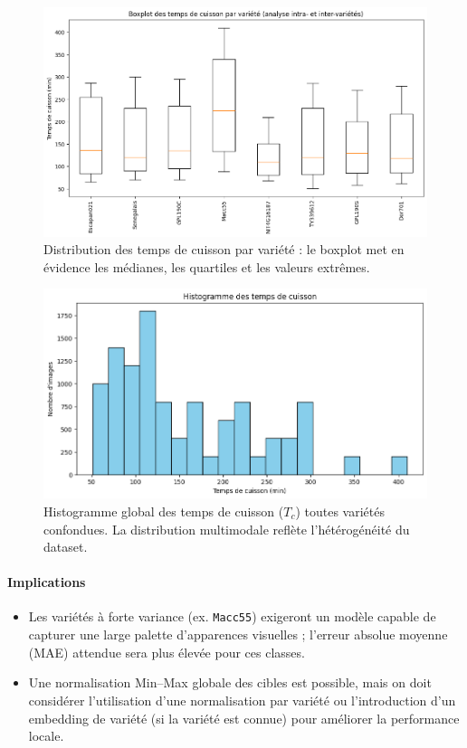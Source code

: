 \begin{figure}[H]
    \centering
    \includegraphics[width=0.8\linewidth]{figures/boxplot_tc.png}
    \caption{Distribution des temps de cuisson par variété : le boxplot met en évidence les médianes, les quartiles et les valeurs extrêmes.}
    \label{fig:boxplot_tc}
\end{figure}

\begin{figure}[H]
    \centering
    \includegraphics[width=0.8\linewidth]{figures/histogramme_tc.png}
    \caption{Histogramme global des temps de cuisson ($T_c$) toutes variétés confondues. La distribution multimodale reflète l’hétérogénéité du dataset.}
    \label{fig:hist_tc}
\end{figure}

\paragraph{Implications}
\begin{itemize}
	\item Les variétés à forte variance (ex. \texttt{Macc55}) exigeront un modèle capable de capturer une large palette d'apparences visuelles ; l'erreur absolue moyenne (MAE) attendue sera plus élevée pour ces classes.
	\item Une normalisation Min--Max globale des cibles est possible, mais on doit considérer l'utilisation d'une normalisation par variété ou l'introduction d'un embedding de variété (si la variété est connue) pour améliorer la performance locale.
\end{itemize}


